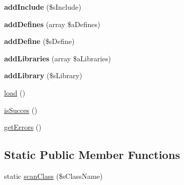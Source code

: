 \begin{DoxyCompactItemize}
\item 
\hypertarget{class_requirement_buffer_ae0e139fec83d34f589df8b6773ebe66b}{{\bfseries add\-Include} (\$s\-Include)}\label{class_requirement_buffer_ae0e139fec83d34f589df8b6773ebe66b}

\item 
\hypertarget{class_requirement_buffer_a04a5ea0d420d8bc4bc79190df0d54d5e}{{\bfseries add\-Defines} (array \$a\-Defines)}\label{class_requirement_buffer_a04a5ea0d420d8bc4bc79190df0d54d5e}

\item 
\hypertarget{class_requirement_buffer_a448ae6291a2228314e4bec0b4c17d3fa}{{\bfseries add\-Define} (\$s\-Define)}\label{class_requirement_buffer_a448ae6291a2228314e4bec0b4c17d3fa}

\item 
\hypertarget{class_requirement_buffer_ac481c1272860a5973721688d35a67b8b}{{\bfseries add\-Libraries} (array \$a\-Libraries)}\label{class_requirement_buffer_ac481c1272860a5973721688d35a67b8b}

\item 
\hypertarget{class_requirement_buffer_ad6a5ce9397c6012e5536b66720cf54bc}{{\bfseries add\-Library} (\$s\-Library)}\label{class_requirement_buffer_ad6a5ce9397c6012e5536b66720cf54bc}

\item 
\hyperlink{class_requirement_buffer_ace5f9878a783b2a20f745dec0a3d65ca}{load} ()
\item 
\hyperlink{class_requirement_buffer_a6a233415483ce799b7058392e0bd554a}{is\-Succes} ()
\item 
\hyperlink{class_requirement_buffer_adb63ca9e31a34afe346c1930757800e2}{get\-Errors} ()
\end{DoxyCompactItemize}
\subsection*{Static Public Member Functions}
\begin{DoxyCompactItemize}
\item 
static \hyperlink{class_requirement_buffer_a2e9ab8141b7c8a1a77b5714f8004d0d1}{scan\-Class} (\$s\-Class\-Name)
\end{DoxyCompactItemize}


